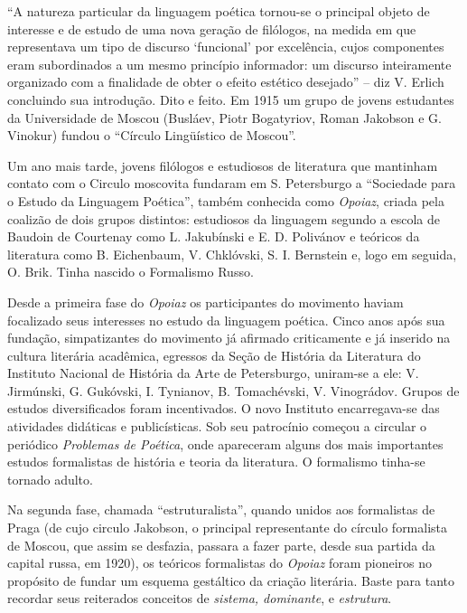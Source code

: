 ``A natureza particular da linguagem poética tornou-se o principal
objeto de interesse e de estudo de uma nova geração de filólogos, na
medida em que representava um tipo de discurso `funcional' por
excelência, cujos componentes eram subordinados a um mesmo princípio
informador: um discurso inteiramente organizado com a finalidade de
obter o efeito estético desejado'' -- diz V. Erlich concluindo sua
introdução. Dito e feito. Em 1915 um grupo de jovens estudantes da
Universidade de Moscou (Busláev, Piotr Bogatyriov, Roman Jakobson e G.
Vinokur) fundou o ``Círculo Lingüístico de Moscou''.

Um ano mais tarde, jovens filólogos e estudiosos de literatura que
mantinham contato com o Circulo moscovita fundaram em S. Petersburgo a
``Sociedade para o Estudo da Linguagem Poética'', também conhecida como
\emph{Opoiaz}, criada pela coalizão de dois grupos distintos: estudiosos
da linguagem segundo a escola de Baudoin de Courtenay como L. Jakubínski
e E. D. Polivánov e teóricos da literatura como B. Eichenbaum, V.
Chklóvski, S. I. Bernstein e, logo em seguida, O. Brik. Tinha nascido o
Formalismo Russo.

Desde a primeira fase do \emph{Opoiaz} os participantes do movimento
haviam focalizado seus interesses no estudo da linguagem poética. Cinco
anos após sua fundação, simpatizantes do movimento já afirmado
criticamente e já inserido na cultura literária acadêmica, egressos da
Seção de História da Literatura do Instituto Nacional de História da
Arte de Petersburgo, uniram-se a ele: V. Jirmúnski, G. Gukóvski, I.
Tynianov, B. Tomachévski, V. Vinográdov. Grupos de estudos
diversificados foram incentivados. O novo Instituto encarregava-se das
atividades didáticas e publicísticas. Sob seu patrocínio começou a
circular o periódico \emph{Problemas de Poética}, onde apareceram alguns
dos mais importantes estudos formalistas de história e teoria da
literatura. O formalismo tinha-se tornado adulto.

Na segunda fase, chamada ``estruturalista'', quando unidos aos
formalistas de Praga (de cujo circulo Jakobson, o principal
representante do círculo formalista de Moscou, que assim se desfazia,
passara a fazer parte, desde sua partida da capital russa, em 1920), os
teóricos formalistas do \emph{Opoiaz} foram pioneiros no propósito de
fundar um esquema gestáltico da criação literária. Baste para tanto
recordar seus reiterados conceitos de \emph{sistema, dominante}, e
\emph{estrutura}.

